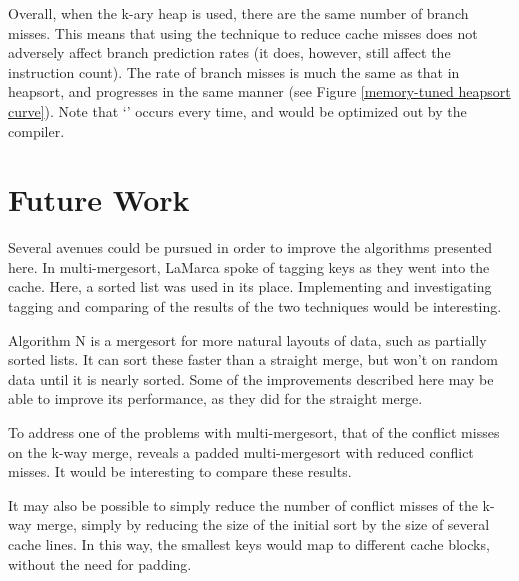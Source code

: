 Overall, when the k-ary heap is used, there are the same number of branch
misses. This means that using the technique to reduce cache misses does not
adversely affect branch prediction rates (it does, however, still affect the
instruction count).  The rate of branch misses is much the same as that in
heapsort, and progresses in the same manner (see Figure \ref{memory-tuned
heapsort curve}). Note that `' occurs every time, and would be
optimized out by the compiler.


\section{Future Work}
Several avenues could be pursued in order to improve the algorithms presented
here. In multi-mergesort, LaMarca spoke of tagging keys as they went into the
cache. Here, a sorted list was used in its place. Implementing and investigating
tagging and comparing of the results of the two techniques would be interesting.

Algorithm N is a mergesort for more natural layouts of data, such as partially
sorted lists. It can sort these faster than a straight merge, but won't on
random data until it is nearly sorted. Some of the improvements described here
may be able to improve its performance, as they did for the straight merge.

To address one of the problems with multi-mergesort, that of the conflict misses
on the k-way merge, \cite{Xiao00} reveals a padded multi-mergesort with reduced 
conflict misses. It would be interesting to compare these results.

It may also be possible to simply reduce the number of conflict misses of the
k-way merge, simply by reducing the size of the initial sort by the size of
several cache lines. In this way, the smallest keys would map to different
cache blocks, without the need for padding.
